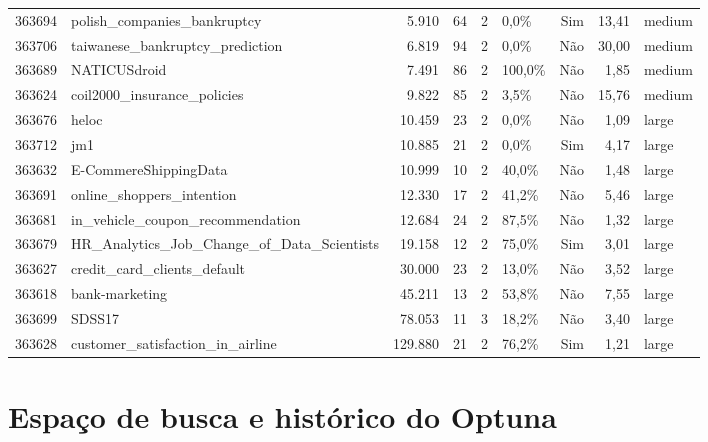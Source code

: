 \documentclass[11pt,a4paper]{article}
\begin{document}
\begin{table}[htbp]
{\begin{tabular}{@{}rlrrrlrrl@{}}
        363694 & polish\_companies\_bankruptcy & 5.910 & 64 & 2 & 0,0\% & Sim & 13,41 & medium \\
        363706 & taiwanese\_bankruptcy\_prediction & 6.819 & 94 & 2 & 0,0\% & Não & 30,00 & medium \\
        363689 & NATICUSdroid & 7.491 & 86 & 2 & 100,0\% & Não & 1,85 & medium \\
        363624 & coil2000\_insurance\_policies & 9.822 & 85 & 2 & 3,5\% & Não & 15,76 & medium \\
        \midrule
        363676 & heloc & 10.459 & 23 & 2 & 0,0\% & Não & 1,09 & large \\
        363712 & jm1 & 10.885 & 21 & 2 & 0,0\% & Sim & 4,17 & large \\
        363632 & E-CommereShippingData & 10.999 & 10 & 2 & 40,0\% & Não & 1,48 & large \\
        363691 & online\_shoppers\_intention & 12.330 & 17 & 2 & 41,2\% & Não & 5,46 & large \\
        363681 & in\_vehicle\_coupon\_recommendation & 12.684 & 24 & 2 & 87,5\% & Não & 1,32 & large \\
        363679 & HR\_Analytics\_Job\_Change\_of\_Data\_Scientists & 19.158 & 12 & 2 & 75,0\% & Sim & 3,01 & large \\
        363627 & credit\_card\_clients\_default & 30.000 & 23 & 2 & 13,0\% & Não & 3,52 & large \\
        363618 & bank-marketing & 45.211 & 13 & 2 & 53,8\% & Não & 7,55 & large \\
        363699 & SDSS17 & 78.053 & 11 & 3 & 18,2\% & Não & 3,40 & large \\
        363628 & customer\_satisfaction\_in\_airline & 129.880 & 21 & 2 & 76,2\% & Sim & 1,21 & large \\
        \bottomrule
    \end{tabular}
    }%
\end{table}

\section{Espaço de busca e histórico do Optuna}
\label{app:optuna}
\end{document}
